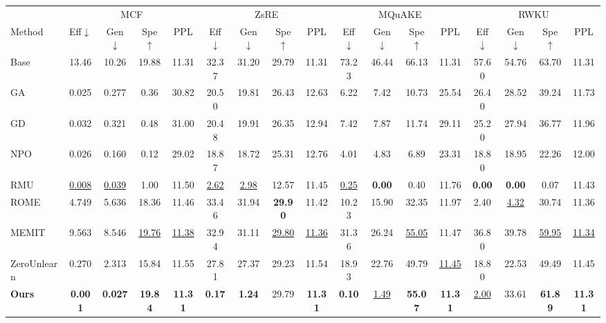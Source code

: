 \documentclass{article}
\theoremstyle{remark}
\theoremstyle{definition}
\begin{document}
\begin{table}[t]
\centering
\small
\setlength{\tabcolsep}{3.2pt}
\begin{tabular}{l cccc cccc cccc cccc}
\toprule
& \multicolumn{4}{c}{MCF} & \multicolumn{4}{c}{ZsRE} & \multicolumn{4}{c}{MQuAKE} & \multicolumn{4}{c}{RWKU} \\
\cmidrule(lr){2-5}\cmidrule(lr){6-9}\cmidrule(lr){10-13}\cmidrule(lr){14-17}
Method & Eff$\downarrow$ & Gen$\downarrow$ & Spe$\uparrow$ & PPL & Eff$\downarrow$ & Gen$\downarrow$ & Spe$\uparrow$ & PPL & Eff$\downarrow$ & Gen$\downarrow$ & Spe$\uparrow$ & PPL & Eff$\downarrow$ & Gen$\downarrow$ & Spe$\uparrow$ & PPL \\
\midrule
Base        & 13.46 & 10.26 & 19.88 & 11.31 & 32.37 & 31.20 & 29.79 & 11.31 & 73.23 & 46.44 & 66.13 & 11.31 & 57.60 & 54.76 & 63.70 & 11.31 \\
\midrule
GA          & 0.025 & 0.277 & 0.36 & 30.82 & 20.50 & 19.81 & 26.43 & 12.63 & 6.22 & 7.42 & 10.73 & 25.54 & 26.40 & 28.52 & 39.24 & 11.73 \\
GD          & 0.032 & 0.321 & 0.48 & 31.00 & 20.48 & 19.91 & 26.35 & 12.94 & 7.42 & 7.87 & 11.74 & 29.11 & 25.20 & 27.94 & 36.77 & 11.96 \\
NPO         & 0.026 & 0.160 & 0.12 & 29.02 & 18.87 & 18.72 & 25.31 & 12.76 & 4.01 & 4.83 & 6.89 & 23.31 & 18.80 & 18.95 & 22.26 & 12.00 \\
RMU         & \underline{0.008} & \underline{0.039} & 1.00 & 11.50 & \underline{2.62} & \underline{2.98} & 12.57 & 11.45 & \underline{0.25} & \textbf{0.00} & 0.40 & 11.76 & \textbf{0.00} & \textbf{0.00} & 0.07 & 11.43 \\
ROME        & 4.749 & 5.636 & 18.36 & 11.46 & 33.46 & 31.94 & \textbf{29.90} & 11.42 & 10.23 & 15.90 & 32.35 & 11.97 & 2.40 & \underline{4.32} & 30.74 & 11.36 \\
MEMIT       & 9.563 & 8.546 & \underline{19.76} & \underline{11.38} & 32.94 & 31.11 & \underline{29.80} & \underline{11.36} & 31.36 & 26.24 & \underline{55.05} & 11.47 & 36.80 & 39.78 & \underline{59.95} & \underline{11.34} \\
ZeroUnlearn & 0.270 & 2.313 & 15.84 & 11.55 & 27.81 & 27.37 & 29.23 & 11.54 & 18.93 & 22.76 & 49.79 & \underline{11.45} & 18.80 & 22.53 & 49.49 & 11.45 \\
\textbf{Ours}& \textbf{0.001} & \textbf{0.027} & \textbf{19.84} & \textbf{11.31} & \textbf{0.17} & \textbf{1.24} & 29.79 & \textbf{11.31} & \textbf{0.10} & \underline{1.49} & \textbf{55.07} & \textbf{11.31} & \underline{2.00} & 33.61 & \textbf{61.89} & \textbf{11.31} \\

\end{tabular}
\end{table}
\end{document}
